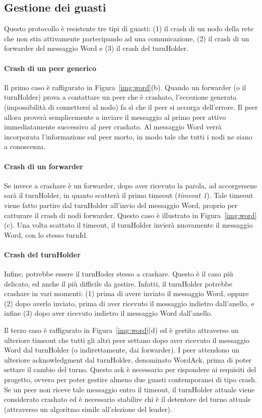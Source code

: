 \documentclass[10.5pt]{article}
\begin{document}
\subsection{Gestione dei guasti}
Questo protocollo è resistente tre tipi di guasti: (1) il crash di un nodo della rete che non stia attivamente partecipando ad una comunicazione, (2) il crash di un forwarder del messaggio Word e (3) il crash del turnHolder.

\paragraph{Crash di un peer generico}
Il primo caso è raffigurato in Figura~\ref{img:word}(b). Quando un forwarder (o il turnHolder) prova a contattare un peer che è crashato, l'eccezione generata (impossibilità di connettersi al nodo) fa sì che il peer si accorga dell'errore. Il peer allora proverà semplicemente a inviare il messaggio al primo peer attivo immediatamente successivo al peer crashato. Al messaggio Word verrà incorporata l'informazione sul peer morto, in modo tale che tutti i nodi ne siano a conoscenza.

\paragraph{Crash di un forwarder}
Se invece a crashare è un forwarder, dopo aver ricevuto la parola, ad accorgersene sarà il turnHolder, in quanto scatterà il primo timeout (\emph{timeout 1}). Tale timeout viene fatto partire dal turnHolder all'invio del messaggio Word, proprio per catturare il crash di nodi forwarder. Questo caso è illustrato in Figura~\ref{img:word}(c). Una volta scattato il timeout, il turnHolder invierà nuovamente il messaggio Word, con lo stesso turnId.

\paragraph{Crash del turnHolder}
Infine, potrebbe essere il turnHoder stesso a crashare. Questo è il caso più delicato, ed anche il più difficile da gestire. Infatti, il turnHolder potrebbe crashare in vari momenti: (1) prima di avere inviato il messaggio Word, oppure (2) dopo averlo inviato, prima di aver ricevuto il messaggio indietro dall'anello, e infine (3) dopo aver ricevuto indietro il messaggio Word dall'anello.

Il terzo caso è raffigurato in Figura~\ref{img:word}(d) ed è gestito attraverso un ulteriore timeout che tutti gli altri peer settano dopo aver ricevuto il messaggio Word dal turnHolder (o indirettamente, dai forwarder). I peer attendono un ulteriore acknowledgment dal turnHolder, denominato WordAck, prima di poter settare il cambio del turno. Questo ack è necessario per rispondere ai requisiti del progetto, ovvero per poter gestire almeno due guasti contemporanei di tipo crash. Se un peer non riceve tale messaggio entro il timeout, il turnHolder attuale viene considerato crashato ed è necessario stabilire chi è il detentore del turno attuale (attraverso un algoritmo simile all'elezione del leader).
\end{document}
